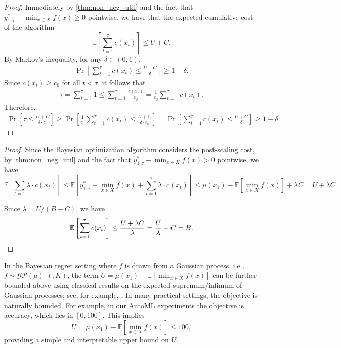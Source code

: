 \ThmTermination*
\begin{proof}
    Immediately by \cref{thm:non_neg_util} and the fact that $y^*_{1:\tau}-\min_{x\in X} f(x) \geq 0$ pointwise, we have that the expected cumulative cost of the algorithm 
    \begin{equation}
        \mathbb{E}\left[\sum_{t=1}^{\tau} c(x_t)\right] \leq U + C. 
    \end{equation}
    By Markov's inequality, for any $\delta \in (0, 1)$,
    \begin{align*}
        \Pr\left[\sum_{t=1}^{\tau} c(x_t) \leq \frac{U + C}{\delta} \right] \geq 1 - \delta. 
    \end{align*}
    Since $c(x_t)\geq c_0$ for all $t<\tau$, it follows that 
    \begin{align*}
        \tau = \sum_{t=1}^\tau 1 \leq  \sum_{t=1}^\tau \frac{c(x_t)}{c_0} = \frac{1}{c_0} \sum_{t=1}^\tau c(x_t).  
    \end{align*}
    Therefore, 
    \begin{align*}
        \Pr\left[\tau \leq \frac{U+C}{\delta \cdot c_0}\right] \geq   \Pr\left[\frac{1}{c_0} \sum_{t=1}^{\tau} c(x_t) \leq \frac{U + C}{\delta \cdot c_0} \right] = \Pr\left[\sum_{t=1}^{\tau} c(x_t) \leq \frac{U + C}{\delta} \right]  \geq 1 - \delta. 
    \end{align*}
\end{proof}

  
\ThmCosts*

\begin{proof}
Since the Bayesian optimization algorithm considers the post-scaling cost, by \cref{thm:non_neg_util} and the fact that $y^*_{1:\tau}-\min_{x\in X} f(x) > 0$ pointwise, we have 
\begin{equation}
\mathbb{E}\left[\sum_{t=1}^{\tau}\lambda \cdot c(x_t)\right] \leq \mathbb{E}\!\left[y^*_{1:\tau}-\min_{x\in X} f(x)+\sum_{t=1}^{\tau} \lambda \cdot c(x_t)\right] \le \mu(x_1)-\mathbb{E}\left[\min_{x\in X}f(x)\right] + \lambda C = U + \lambda C. 
\end{equation}

Since $\lambda = U/(B-C)$, we have \[\mathbb{E}\left[\sum_{t=1}^{\tau} c(x_t)\right] \leq \frac{U + \lambda C}{\lambda} = \frac{U}{\lambda} + C = B.\] 
\end{proof}

\begin{remark}
In the Bayesian regret setting where $f$ is drawn from a Gaussian process, i.e., $f \sim \mathcal{GP}(\mu(\cdot), K)$, the term $U = \mu(x_1) - \mathbb{E}\left[\min_{x\in X} f(x)\right]$ can be further bounded above using classical results on the expected supremum/infimum of Gaussian processes; see, for example, \citet[Theorem 10.1]{lifshits2012lectures}.
In many practical settings, the objective is naturally bounded. For example, in our AutoML experiments the objective is accuracy, which lies in $[0,100]$. This implies
\[
U = \mu(x_1) - \mathbb{E}\left[\min_{x\in X} f(x)\right] \le 100,
\]
providing a simple and interpretable upper bound on $U$.
\end{remark}
 

